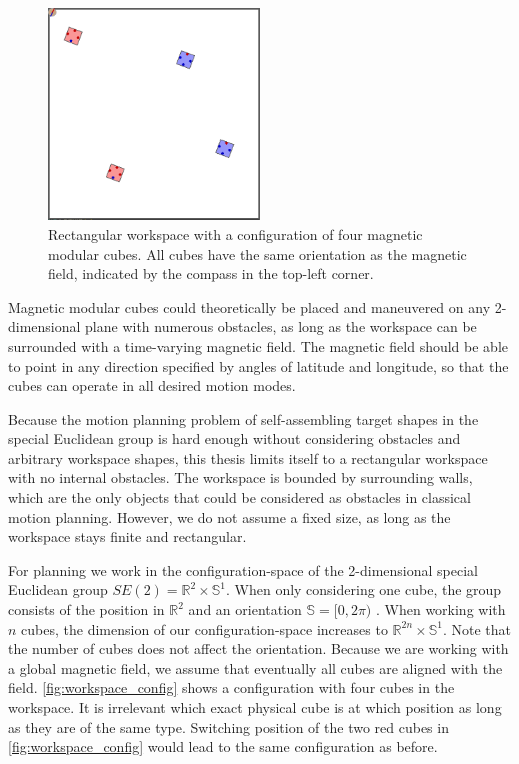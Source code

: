 \begin{figure}
	\centering
	\includegraphics[width=0.5\textwidth]{figures/workspace_config.png}
	\caption[Workspace configuration of four magnetic modular cubes]{Rectangular workspace with a configuration of four magnetic modular cubes. All cubes have the same orientation as the magnetic field, indicated by the compass in the top-left corner.}
	\label{fig:workspace_config}
\end{figure}

Magnetic modular cubes could theoretically be placed and maneuvered on any 2-dimen\-sional plane with numerous obstacles, as long as the workspace can be surrounded with a time-varying magnetic field.
The magnetic field should be able to point in any direction specified by angles of latitude and longitude, so that the cubes can operate in all desired motion modes.

Because the motion planning problem of self-assembling target shapes in the special Euclidean group is hard enough without considering obstacles and arbitrary workspace shapes, this thesis limits itself to a rectangular workspace with no internal obstacles.
The workspace is bounded by surrounding walls, which are the only objects that could be considered as obstacles in classical motion planning.
However, we do not assume a fixed size, as long as the workspace stays finite and rectangular.


For planning we work in the configuration-space of the 2-dimensional special Euclidean group $\textit{SE}(2) = \mathbb{R}^2 \times \mathbb{S}^1$.
When only considering one cube, the group consists of the position in $\mathbb{R}^2$ and an orientation $\mathbb{S} = [0,2\pi)$ \cite{LaValle2006}.
When working with $n$ cubes, the dimension of our configuration-space increases to $\mathbb{R}^{2n} \times \mathbb{S}^1$.
Note that the number of cubes does not affect the orientation.
Because we are working with a global magnetic field, we assume that eventually all cubes are aligned with the field.
\autoref{fig:workspace_config} shows a configuration with four cubes in the workspace.
It is irrelevant which exact physical cube is at which position as long as they are of the same type.
Switching position of the two red cubes in \autoref{fig:workspace_config} would lead to the same configuration as before.

